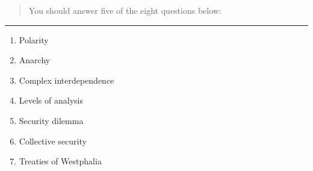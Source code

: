 \documentclass[
]{book}
\begin{document}
\begin{quote}
You should answer five of the eight questions below:
\end{quote}

\begin{center}\rule{0.5\linewidth}{0.5pt}\end{center}

\begin{enumerate}
\def\labelenumi{\arabic{enumi}.}
\item
  Polarity
\item
  Anarchy
\item
  Complex interdependence
\item
  Levels of analysis
\item
  Security dilemma
\item
  Collective security
\item
  Treaties of Westphalia
\end{enumerate}

  
\end{document}
